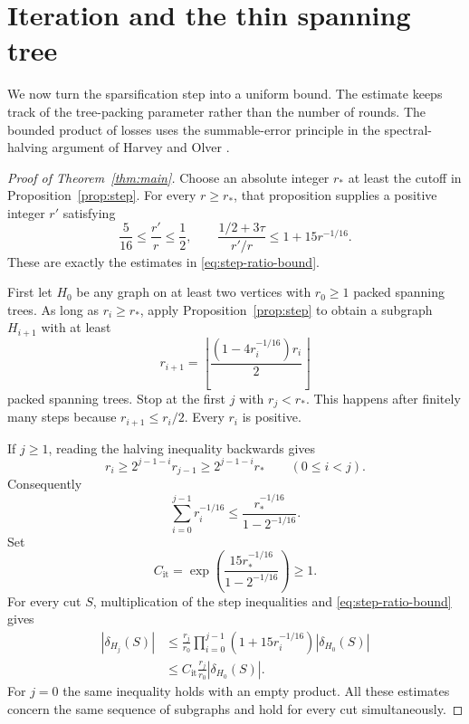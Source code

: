 \section{Iteration and the thin spanning tree}\label{sec:iteration}

We now turn the sparsification step into a uniform bound.
The estimate keeps track of the tree-packing parameter rather than
the number of rounds.
The bounded product of losses uses the summable-error principle in
the spectral-halving argument of Harvey and Olver
\cite[Appendix~F, Claims~F.3--F.4]{HarveyOlver2014}.

\begin{proof}[Proof of Theorem~\ref{thm:main}]
Choose an absolute integer \(r_*\) at least the cutoff in
Proposition~\ref{prop:step}. For every \(r\ge r_*\), that proposition
supplies a positive integer \(r'\) satisfying
\[
 \frac5{16}\le\frac{r'}r\le\frac12,
 \qquad
 \frac{1/2+3\tau}{r'/r}\le1+15r^{-1/16}.
\]
These are exactly the estimates in \eqref{eq:step-ratio-bound}.

First let \(H_0\) be any graph on at least two vertices with
\(r_0\ge1\) packed spanning trees. As long as \(r_i\ge r_*\), apply
Proposition~\ref{prop:step} to obtain a subgraph \(H_{i+1}\)
with at least
\[
 r_{i+1}=
 \left\lfloor\frac{(1-4r_i^{-1/16})r_i}{2}\right\rfloor
\]
packed spanning trees. Stop at the first \(j\) with \(r_j<r_*\).
This happens after finitely many steps because
\(r_{i+1}\le r_i/2\). Every \(r_i\) is positive.

If \(j\ge1\), reading the halving inequality backwards gives
\[
 r_i\ge2^{j-1-i}r_{j-1}
 \ge2^{j-1-i}r_*
 \qquad(0\le i<j).
\]
Consequently
\[
 \sum_{i=0}^{j-1}r_i^{-1/16}
 \le\frac{r_*^{-1/16}}{1-2^{-1/16}}.
\]
Set
\begin{equation}\label{eq:constant-C2}
 C_{\mathrm{it}}=\exp\left(
 \frac{15r_*^{-1/16}}{1-2^{-1/16}}
 \right)\ge1.
\end{equation}
For every cut \(S\), multiplication of the step inequalities and
\eqref{eq:step-ratio-bound} gives
\[
 \begin{aligned}
 |\delta_{H_j}(S)|
 &\le\frac{r_j}{r_0}
   \prod_{i=0}^{j-1}(1+15r_i^{-1/16})
   |\delta_{H_0}(S)|\\
 &\le C_{\mathrm{it}}\frac{r_j}{r_0}|\delta_{H_0}(S)|.
 \end{aligned}
\]
For \(j=0\) the same inequality holds with an empty product.
All these estimates concern the same sequence of subgraphs and
hold for every cut simultaneously.


\end{proof}
